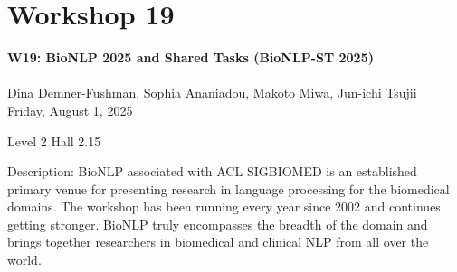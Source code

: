\clearpage


\section[W19: BioNLP 2025 and Shared Tasks (BioNLP-ST 2025)]{Workshop 19}
\label{workshop_19}

\begin{center}
    {\Large \textbf{W19: BioNLP 2025 and Shared Tasks (BioNLP-ST 2025)}}\\
\\

 Dina Demner-Fushman, Sophia Ananiadou, Makoto Miwa, Jun-ichi Tsujii\\

    Friday, August 1, 2025
    
  Level 2 Hall 2.15
\end{center}

Description: BioNLP associated with ACL SIGBIOMED is an established primary venue for presenting research in language processing for the biomedical domains. The workshop has been running every year since 2002 and continues getting stronger. BioNLP truly encompasses the breadth of the domain and brings together researchers in biomedical and clinical NLP from all over the world.

